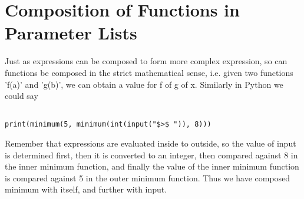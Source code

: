 \section{Composition of Functions in Parameter Lists}

Just as expressions can be composed to form more complex expression,   so can functions be composed in the strict mathematical sense, i.e.   given two functions 'f(a)' and 'g(b)', we can obtain a value for f of g   of x. Similarly in Python we could say
\begin{lstlisting}

print(minimum(5, minimum(int(input("$>$ ")), 8)))
\end{lstlisting}

Remember that expressions are evaluated inside to outside, so the   value of input is determined first, then it is converted to an   integer, then compared against 8 in the inner minimum function, and   finally the value of the inner minimum function is compared against 5   in the outer minimum function. Thus we have composed minimum with   itself, and further with input.

